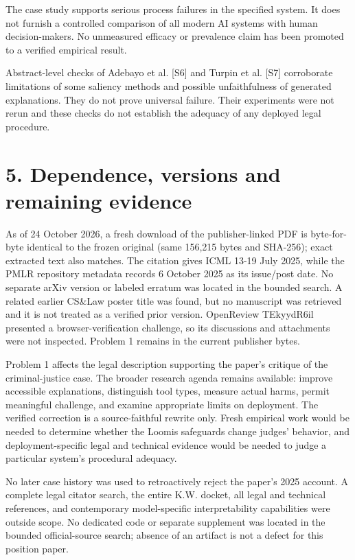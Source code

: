 \documentclass[10pt]{article}
\begin{document}
The case study supports serious process failures in the specified system. It does not furnish a controlled comparison of all modern AI systems with human decision-makers. No unmeasured efficacy or prevalence claim has been promoted to a verified empirical result.\par
Abstract-level checks of Adebayo et al. [S6] and Turpin et al. [S7] corroborate limitations of some saliency methods and possible unfaithfulness of generated explanations. They do not prove universal failure. Their experiments were not rerun and these checks do not establish the adequacy of any deployed legal procedure.\par
\section*{5. Dependence, versions and remaining evidence}
As of 24 October 2026, a fresh download of the publisher-linked PDF is byte-for-byte identical to the frozen original (same 156,215 bytes and SHA-256); exact extracted text also matches. The citation gives ICML 13-19 July 2025, while the PMLR repository metadata records 6 October 2025 as its issue/post date. No separate arXiv version or labeled erratum was located in the bounded search. A related earlier CS\&Law poster title was found, but no manuscript was retrieved and it is not treated as a verified prior version. OpenReview TEkyydR6il presented a browser-verification challenge, so its discussions and attachments were not inspected. Problem 1 remains in the current publisher bytes.\par
Problem 1 affects the legal description supporting the paper’s critique of the criminal-justice case. The broader research agenda remains available: improve accessible explanations, distinguish tool types, measure actual harms, permit meaningful challenge, and examine appropriate limits on deployment. The verified correction is a source-faithful rewrite only. Fresh empirical work would be needed to determine whether the Loomis safeguards change judges’ behavior, and deployment-specific legal and technical evidence would be needed to judge a particular system’s procedural adequacy.\par
No later case history was used to retroactively reject the paper’s 2025 account. A complete legal citator search, the entire K.W. docket, all legal and technical references, and contemporary model-specific interpretability capabilities were outside scope. No dedicated code or separate supplement was located in the bounded official-source search; absence of an artifact is not a defect for this position paper.\par
\end{document}
